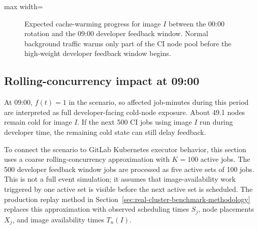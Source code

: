 \documentclass[11pt,a4paper]{article}
\begin{document}
\begin{table}[H]
\centering
\caption{Cache-state progression after the CI node-pool rotation. The table tracks jobs using image \(I\), not all CI jobs.}
\label{tab:nightcache}
\small
\begin{adjustbox}{max width=\linewidth}

\end{adjustbox}
\end{table}

\begin{figure}[H]
\centering
{}
\caption{Expected cache-warming progress for image \(I\) between the 00:00 rotation and the 09:00 developer feedback window. Normal background traffic warms only part of the CI node pool before the high-weight developer feedback window begins.}
\label{fig:nightcacheprogress}
\end{figure}


\subsection{Rolling-concurrency impact at 09:00}

At 09:00, \(f(t)=1\) in the scenario, so affected job-minutes during this period are interpreted as full developer-facing cold-node exposure. About 49.1 nodes remain cold for image \(I\). If the next 500 CI jobs using image \(I\) run during developer time, the remaining cold state can still delay feedback.

To connect the scenario to GitLab Kubernetes executor behavior, this section uses a coarse rolling-concurrency approximation with \(K=100\) active jobs. The 500 developer feedback window jobs are processed as five active sets of 100 jobs. This is not a full event simulation; it assumes that image-availability work triggered by one active set is visible before the next active set is scheduled. The production replay method in Section~\ref{sec:real-cluster-benchmark-methodology} replaces this approximation with observed scheduling times \(S_j\), node placements \(X_j\), and image availability times \(T_n(I)\).
\end{document}
